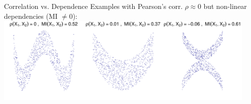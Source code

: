 \documentclass[10pt,compress,t,notes=noshow, xcolor=table]{beamer}
\begin{document}
\begin{frame}{Correlation vs. Dependence}
{Examples with Pearson's corr. $\rho \approx 0$ but non-linear dependencies (MI $\neq 0$):\\
\medskip
\centering
\includegraphics[width = 0.95\textwidth]{figure/dependence_3}}
\end{frame}




\end{document}
